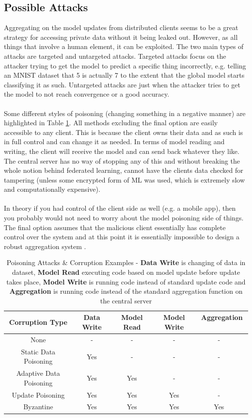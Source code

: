 \subsection{Possible Attacks}
Aggregating on the model updates from distributed clients seems to be a great strategy for accessing private data without it being leaked out. 
However, as all things that involve a human element, it can be exploited. 
The two main types of attacks are targeted and untargeted attacks.
Targeted attacks focus on the attacker trying to get the model to predict a specific thing incorrectly, e.g. telling an MNIST dataset that 5 is actually 7 to the extent that the global model starts classifying it as such. 
Untargeted attacks are just when the attacker tries to get the model to not reach convergence or a good accuracy.
\\ \\
Some different styles of poisoning (changing something in a negative manner) are highlighted in Table \ref{tbl:poisoning}. 
All methods excluding the final option are easily accessible to any client.
This is because the client owns their data and as such is in full control and can change it as needed. 
In terms of model reading and writing, the client will receive the model and can send back whatever they like. 
The central server has no way of stopping any of this and without breaking the whole notion behind federated learning, cannot have the clients data checked for tampering (unless some encrypted form of ML was used, which is extremely slow and computationally expensive). \\ \\
In theory if you had control of the client side as well (e.g. a mobile app), then you probably would not need to worry about the model poisoning side of things. 
The final option assumes that the malicious client essentially has complete control over the system and at this point it is essentially impossible to design a robust aggregation system \cite{robagg_fl}.
\begin{center}
    \begin{longtable}{ |c|c|c|c|c| }
    \caption{Poisoning Attacks \& Corruption Examples \cite{robagg_fl} - \textbf{Data Write} is changing of data in dataset, \textbf{Model Read} executing code based on model update before update takes place, \textbf{Model Write} is running code instead of standard update code and \textbf{Aggregation} is running code instead of the standard aggregation function on the central server}
    \label{tbl:poisoning}
    \hline
    \textbf{Corruption Type} & \textbf{Data Write} & \textbf{Model Read} & \textbf{Model Write} & \textbf{Aggregation} \ \\ \hline
    None & - & - & - & - \ \\ \hline
    Static Data Poisoning & Yes & - & - & - \ \\ \hline
    Adaptive Data Poisoning & Yes & Yes & - & - \ \\ \hline
    Update Poisoning & Yes & Yes & Yes & - \ \\ \hline
    Byzantine & Yes & Yes & Yes & Yes \ \\ \hline
    \end{longtable}
\end{center}
